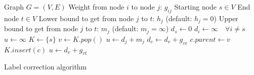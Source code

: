 \documentclass{article}
\begin{document}
\begin{preview}
    \begin{algorithm}[H]
        \begin{algorithmic}
        \Require
        \Statex Graph $G = (V, E)$
        \Statex Weight from node $i$ to node $j$: $g_{ij}$
        \Statex Starting node $s \in V$
        \Statex End node $t \in V$
        \Statex Lower bound to get from node $j$ to $t$: $h_j$ (default: $h_j = 0$)
        \Statex Upper bound to get from node $j$ to $t$: $m_j$ (default: $m_j = \infty$)
            \State $d_s \gets 0$
            \State $d_i \gets \infty \quad \forall i \neq s$ 
            \State $u \gets \infty$ 
            \State $K \gets \{s\}$ 
                \State $v \gets K.pop()$
                        \State $u \gets d_j + m_j$
                    \EndIf
                        \State $d_c \gets d_v + g_{vc}$
                        \State $c.parent \gets v$
                            \State $K.insert(c)$
                        \EndIf
                            \State $u \gets d_v + g_{vt}$
                        \EndIf
                    \EndIf
                \EndFor
            \EndWhile
        \EndProcedure
        \end{algorithmic}
    \caption{Label correction algorithm}
    \label{alg:label-correction-algorithm}
    \end{algorithm}
\end{preview}
\end{document}
